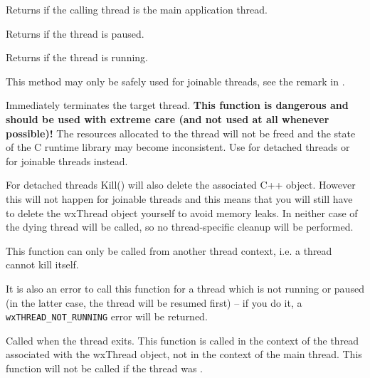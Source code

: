 Returns \true if the calling thread is the main application thread.


\label{wxthreadispaused}


Returns \true if the thread is paused.


\label{wxthreadisrunning}


Returns \true if the thread is running.

This method may only be safely used for joinable threads, see the remark in 
.


\label{wxthreadkill}


Immediately terminates the target thread. {\bf This function is dangerous and should
be used with extreme care (and not used at all whenever possible)!} The resources
allocated to the thread will not be freed and the state of the C runtime library
may become inconsistent. Use  for detached 
threads or  for joinable threads instead.

For detached threads Kill() will also delete the associated C++ object.
However this will not happen for joinable threads and this means that you will
still have to delete the wxThread object yourself to avoid memory leaks.
In neither case  of the dying thread will be
called, so no thread-specific cleanup will be performed.

This function can only be called from another thread context, i.e. a thread
cannot kill itself.

It is also an error to call this function for a thread which is not running or
paused (in the latter case, the thread will be resumed first) -- if you do it,
a {\tt wxTHREAD\_NOT\_RUNNING} error will be returned.


\label{wxthreadonexit}


Called when the thread exits. This function is called in the context of the
thread associated with the wxThread object, not in the context of the main
thread. This function will not be called if the thread was
.

